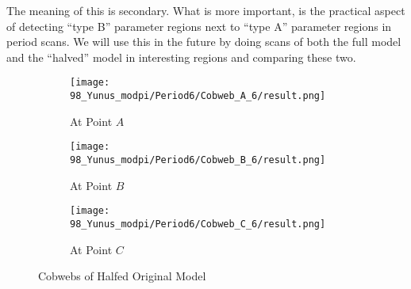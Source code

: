 The meaning of this is secondary.
What is more important, is the practical aspect of detecting ``type B'' parameter regions next to ``type A'' parameter regions in period scans.
We will use this in the future by doing scans of both the full model and the ``halved'' model in interesting regions and comparing these two.


\begin{figure}
	\centering
	\begin{subfigure}{0.3\textwidth}
		\centering
		\texttt{[image: 98\_Yunus\_modpi/Period6/Cobweb\_A\_6/result.png]}
		\caption{At Point $A$}
		\label{fig:yunus.pi.CobwebA6}
	\end{subfigure}
	\begin{subfigure}{0.3\textwidth}
		\centering
		\texttt{[image: 98\_Yunus\_modpi/Period6/Cobweb\_B\_6/result.png]}
		\caption{At Point $B$}
		\label{fig:yunus.pi.CobwebB6}
	\end{subfigure}
	\begin{subfigure}{0.3\textwidth}
		\centering
		\texttt{[image: 98\_Yunus\_modpi/Period6/Cobweb\_C\_6/result.png]}
		\caption{At Point $C$}
		\label{fig:yunus.pi.CobwebC6}
	\end{subfigure}
	\caption{Cobwebs of Halfed Original Model}
\end{figure}

